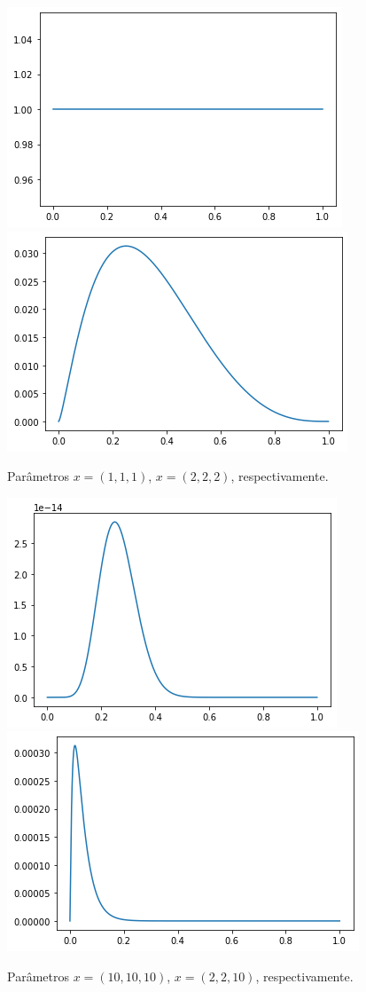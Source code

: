 \documentclass[11pt, a4paper]{article}
\begin{document}
\begin{figure}[H]
\centering
\includegraphics[scale = 0.5]{1 - 111,111.png}
\includegraphics[scale = 0.5]{2 - 222,000.png}
\caption{Parâmetros $x = (1,1,1)$, $x=(2,2,2)$, respectivamente.}
\end{figure}

\begin{figure}[H]
\centering
\includegraphics[scale = 0.5]{3 - 101010,000.png}
\includegraphics[scale = 0.5]{4 - 2210,000.png}
\caption{Parâmetros $x = (10, 10, 10)$, $x=(2,2,10)$, respectivamente.}
\end{figure}
\end{document}
